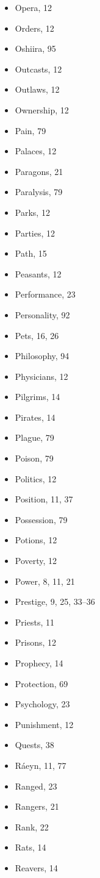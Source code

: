 \begin{multicols}{2}
\begin{itemize}
  \item Opera, 12
  \item Orders, 12
  \item Oshiira, 95
  \item Outcasts, 12
  \item Outlaws, 12
  \item Ownership, 12
  \item Pain, 79
  \item Palaces, 12
  \item Paragons, 21
  \item Paralysis, 79
  \item Parks, 12
  \item Parties, 12
  \item Path, 15
  \item Peasants, 12
  \item Performance, 23
  \item Personality, 92
  \item Pets, 16, 26
  \item Philosophy, 94
  \item Physicians, 12
  \item Pilgrims, 14
  \item Pirates, 14
  \item Plague, 79
  \item Poison, 79
  \item Politics, 12
  \item Position, 11, 37
  \item Possession, 79
  \item Potions, 12
  \item Poverty, 12
  \item Power, 8, 11, 21
  \item Prestige, 9, 25, 33--36
  \item Priests, 11
  \item Prisons, 12
  \item Prophecy, 14
  \item Protection, 69
  \item Psychology, 23
  \item Punishment, 12
  \item Quests, 38
  \item Ráeyn, 11, 77
  \item Ranged, 23
  \item Rangers, 21
  \item Rank, 22
  \item Rats, 14
  \item Reavers, 14

\end{itemize}
\end{multicols}
